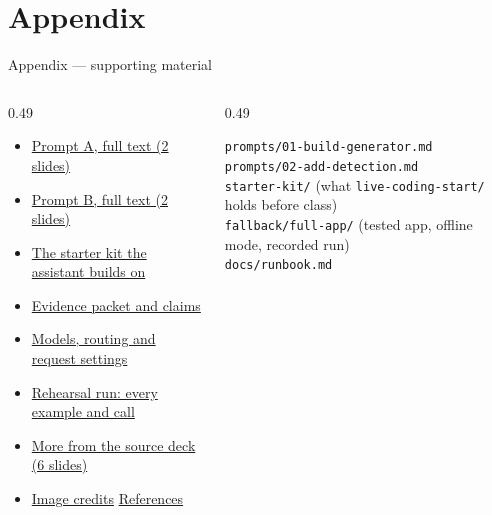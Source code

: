 \appendix
\section[Appendix]{Appendix}

\begin{frame}{Appendix --- supporting material}
  \footnotesize
  \begin{columns}[T,onlytextwidth]
    \begin{column}{0.49\textwidth}
      \begin{readme}[Contents]
        \begin{itemize}\setlength{\itemsep}{1pt}
          \item \hyperlink{frm:promptAfull}{Prompt A, full text (2 slides)}
          \item \hyperlink{frm:promptBfull}{Prompt B, full text (2 slides)}
          \item \hyperlink{frm:kit}{The starter kit the assistant builds on}
          \item \hyperlink{frm:evidence}{Evidence packet and claims}
          \item \hyperlink{frm:models}{Models, routing and request settings}
          \item \hyperlink{frm:rehearsal}{Rehearsal run: every example and call}
          \item \hyperlink{frm:sourcemap}{More from the source deck (6 slides)}
          \item \hyperlink{frm:credits}{Image credits} \textperiodcentered{} \hyperlink{frm:refs}{References}
        \end{itemize}
      \end{readme}
    \end{column}
    \begin{column}{0.49\textwidth}
      \begin{labnote}
        \texttt{prompts/01-build-generator.md}\\
        \texttt{prompts/02-add-detection.md}\\
        \texttt{starter-kit/} (what \texttt{live-coding-start/} holds before class)\\
        \texttt{fallback/full-app/} (tested app, offline mode, recorded run)\\
        \texttt{docs/runbook.md}
      \end{labnote}
      \centering\hyperlink{frm:resources}{}
    \end{column}
  \end{columns}
\end{frame}

